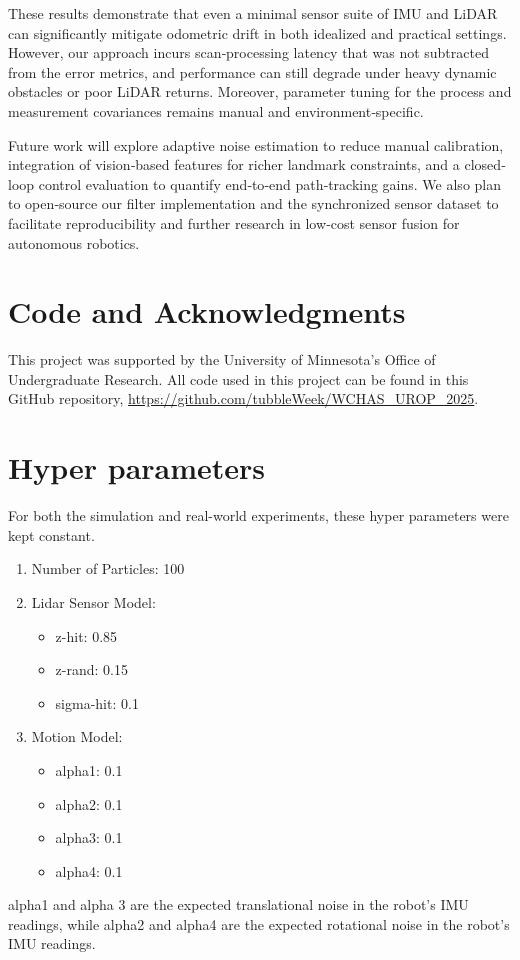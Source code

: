 \documentclass[10.5pt]{article}
\begin{document}
These results demonstrate that even a minimal sensor suite of IMU and LiDAR can significantly mitigate odometric drift in both idealized and practical settings.  However, our approach incurs scan‐processing latency that was not subtracted from the error metrics, and performance can still degrade under heavy dynamic obstacles or poor LiDAR returns.  Moreover, parameter tuning for the process and measurement covariances remains manual and environment‐specific.

Future work will explore adaptive noise estimation to reduce manual calibration, integration of vision‐based features for richer landmark constraints, and a closed‐loop control evaluation to quantify end‐to‐end path‐tracking gains.  We also plan to open‐source our filter implementation and the synchronized sensor dataset to facilitate reproducibility and further research in low‐cost sensor fusion for autonomous robotics.

\section{Code and Acknowledgments}
This project was supported by the University of Minnesota's Office of
Undergraduate Research. All code used in this project can be found in this GitHub repository, \url{https://github.com/tubbleWeek/WCHAS_UROP_2025}. 

\section{Hyper parameters}
For both the simulation and real-world experiments, these hyper parameters were kept constant.
\begin{enumerate}
    \item Number of Particles: 100
    \item Lidar Sensor Model:
    \begin{itemize}
        \item z-hit: 0.85
        \item z-rand: 0.15
        \item sigma-hit: 0.1
    \end{itemize}
    \item Motion Model:
    \begin{itemize}
        \item alpha1: 0.1
        \item alpha2: 0.1
        \item alpha3: 0.1
        \item alpha4: 0.1
    \end{itemize}
\end{enumerate}
alpha1 and alpha 3 are the expected translational noise in the robot's IMU readings, while alpha2 and alpha4 are the expected rotational noise in the robot's IMU readings.


\end{document}
